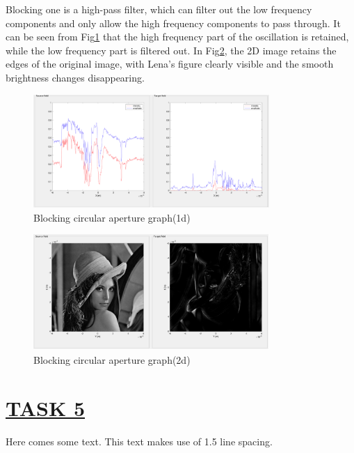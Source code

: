 \documentclass[fontsize=11pt]{scrartcl}
\begin{document}
Blocking one is a high-pass filter, which can filter out the low frequency components 
and only allow the high frequency components to pass through. 
It can be seen from Fig\ref{fig4.3} that the high frequency part of the oscillation is 
retained, while the low frequency part is filtered out. 
In Fig\ref{fig4.4}, the 2D image retains the edges of the original image, 
with Lena’s figure clearly visible and the smooth brightness changes disappearing.
\begin{figure}[H]
    \centering
     \includegraphics[width=0.8\textwidth]{img/4_3.png}
     \caption{Blocking circular aperture graph(1d)}
     \label{fig4.3}
\end{figure}
\begin{figure}[H]
    \centering
     \includegraphics[width=0.8\textwidth]{img/4_4.png}
     \caption{Blocking circular aperture graph(2d)}
     \label{fig4.4}
\end{figure}
\pagebreak
\section{\uline{TASK 5}}
Here comes some text. This text makes use of 1.5 line spacing. 
\end{document}
